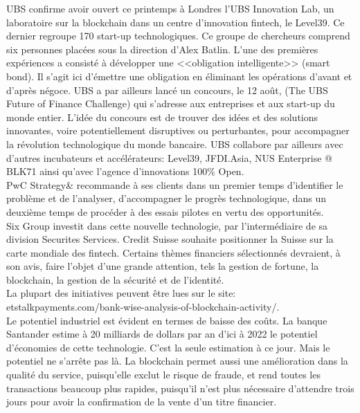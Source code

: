\documentclass[11pt,twoside,a4paper]{article}
\begin{document}
UBS confirme avoir ouvert ce printemps {\`a} Londres l'UBS Innovation Lab, un laboratoire sur la blockchain dans un centre d'innovation fintech, le Level39. Ce dernier regroupe 170 start-up technologiques. Ce groupe de chercheurs comprend six personnes plac{\'e}es sous la direction d'Alex Batlin. L'une des premi{\`e}res exp{\'e}riences a consist{\'e} {\`a} d{\'e}velopper une <<obligation intelligente>> (smart bond). Il s'agit ici d'{\'e}mettre une obligation en {\'e}liminant les op{\'e}rations d'avant et d'apr{\`e}s n{\'e}goce. UBS a par ailleurs lanc{\'e} un concours, le 12 ao{\^u}t, (The UBS Future of Finance Challenge) qui s'adresse aux entreprises et aux start-up du monde entier. L'id{\'e}e du concours est de trouver des id{\'e}es et des solutions innovantes, voire potentiellement disruptives ou perturbantes, pour accompagner la r{\'e}volution technologique du monde bancaire. UBS collabore par ailleurs avec d'autres incubateurs et acc{\'e}l{\'e}rateurs: Level39, JFDI.Asia, NUS Enterprise @ BLK71 ainsi qu'avec l'agence d'innovations 100\% Open. ~\\

PwC Strategy\& recommande {\`a} ses clients dans un premier temps d'identifier le probl{\`e}me et de l'analyser, d'accompagner le progr{\`e}s technologique, dans un deuxi{\`e}me temps de proc{\'e}der {\`a} des essais pilotes en vertu des opportunit{\'e}s. ~\\
Six Group investit dans cette nouvelle technologie, par l'interm{\'e}diaire de sa division Securites Services. Credit Suisse souhaite positionner la Suisse sur la carte mondiale des fintech. Certains th{\`e}mes financiers s{\'e}lectionn{\'e}s devraient, {\`a} son avis, faire l'objet d'une grande attention, tels la gestion de fortune, la blockchain, la gestion de la s{\'e}curit{\'e} et de l'identit{\'e}. ~\\

La plupart des initiatives peuvent {\^e}tre lues sur le site: etstalkpayments.com/bank-wise-analysis-of-blockchain-activity/. ~\\

Le potentiel industriel est {\'e}vident en termes de baisse des co{\^u}ts. La banque Santander estime {\`a} 20 milliards de dollars par an d'ici {\`a} 2022 le potentiel d'{\'e}conomies de cette technologie. C'est la seule estimation {\`a} ce jour. Mais le potentiel ne s'arr{\^e}te pas l{\`a}. La blockchain permet aussi une am{\'e}lioration dans la qualit{\'e} du service, puisqu'elle exclut le risque de fraude, et rend toutes les transactions beaucoup plus rapides, puisqu'il n'est plus n{\'e}cessaire d'attendre trois jours pour avoir la confirmation de la vente d'un titre financier.~\\
\end{document}
